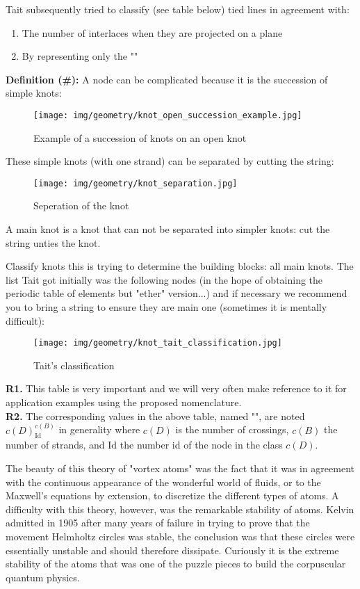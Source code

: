 {	Tait subsequently tried to classify (see table below) tied lines in agreement with:
	\begin{enumerate}
		\item The number of interlaces when they are projected on a plane
		
		\item By representing only the ""
	\end{enumerate}
	\textbf{Definition (\#\mydef):} A node can be complicated because it is the succession of simple knots:
	\begin{figure}[H]
		\centering
		\texttt{[image: img/geometry/knot\_open\_succession\_example.jpg]}
		\caption{Example of a succession of knots on an open knot}
	\end{figure}
	These simple knots (with one strand) can be separated by cutting the string:
	\begin{figure}[H]
		\centering
		\texttt{[image: img/geometry/knot\_separation.jpg]}
		\caption{Seperation of the knot}
	\end{figure}
	A main knot is a knot that can not be separated into simpler knots: cut the string unties the knot.
	
	Classify knots this is trying to determine the building blocks: all main knots. The list Tait got initially was the following nodes (in the hope of obtaining the periodic table of elements but "ether" version...) and if necessary we recommend you to bring a string to ensure they are main one (sometimes it is mentally difficult):
	\begin{figure}[H]
		\centering
		\texttt{[image: img/geometry/knot\_tait\_classification.jpg]}
		\caption{Tait's classification}
	\end{figure}
	\begin{tcolorbox}[title=Remark,colframe=black,arc=10pt]
	\textbf{R1.} This table is very important and we will very often make reference to it for application examples using the proposed nomenclature.\\
	
	\textbf{R2.} The corresponding values in the above table, named "", are noted $c(D)_{\text{Id}}^{c(B)}$ in generality where $c(D)$ is the number of crossings, $c(B)$ the number of strands, and $\text{Id}$ the number id of the node in the class $c(D)$.
	\end{tcolorbox}
	The beauty of this theory of "vortex atoms" was the fact that it was in agreement with the continuous appearance of the wonderful world of fluids, or to the Maxwell's equations by extension, to discretize the different types of atoms. A difficulty with this theory, however, was the remarkable stability of atoms. Kelvin admitted in 1905 after many years of failure in trying to prove that the movement Helmholtz circles was stable, the conclusion was that these circles were essentially unstable and should therefore dissipate. Curiously it is the extreme stability of the atoms that was one of the puzzle pieces to build the corpuscular quantum physics.
	
}
